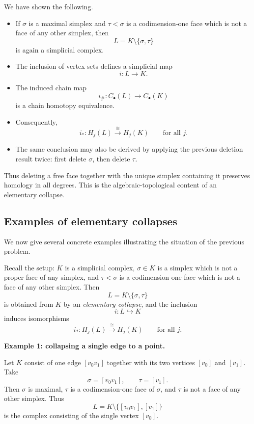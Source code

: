 \documentclass[12pt,a4paper]{article}
\theoremstyle{notespace}
\begin{document}
We have shown the following.

\begin{itemize}
	\item If \(\sigma\) is a maximal simplex and \(\tau<\sigma\) is a codimension-one face which is not a face of any other simplex, then
	\[
	L=K\setminus\{\sigma,\tau\}
	\]
	is again a simplicial complex.
	
	\item The inclusion of vertex sets defines a simplicial map
	\[
	i:L\to K.
	\]
	
	\item The induced chain map
	\[
	i_\#:C_\bullet(L)\to C_\bullet(K)
	\]
	is a chain homotopy equivalence.
	
	\item Consequently,
	\[
	i_*:H_j(L)\xrightarrow{\cong} H_j(K)
	\qquad\text{for all } j.
	\]
	
	\item The same conclusion may also be derived by applying the previous deletion result twice: first delete \(\sigma\), then delete \(\tau\).
\end{itemize}

Thus deleting a free face together with the unique simplex containing it preserves homology in all degrees. This is the algebraic-topological content of an elementary collapse.

\subsection{Examples of elementary collapses}

We now give several concrete examples illustrating the situation of the previous problem.

Recall the setup: \(K\) is a simplicial complex, \(\sigma\in K\) is a simplex which is not a proper face of any simplex, and \(\tau<\sigma\) is a codimension-one face which is not a face of any other simplex. Then
\[
L=K\setminus\{\sigma,\tau\}
\]
is obtained from \(K\) by an \emph{elementary collapse}, and the inclusion
\[
i:L\hookrightarrow K
\]
induces isomorphisms
\[
i_*:H_j(L)\xrightarrow{\cong} H_j(K)
\qquad\text{for all } j.
\]

\medskip

\textbf{Example 1: collapsing a single edge to a point.}

Let \(K\) consist of one edge \([v_0v_1]\) together with its two vertices \([v_0]\) and \([v_1]\). Take
\[
\sigma=[v_0v_1],\qquad \tau=[v_1].
\]
Then \(\sigma\) is maximal, \(\tau\) is a codimension-one face of \(\sigma\), and \(\tau\) is not a face of any other simplex. Thus
\[
L=K\setminus\{[v_0v_1],[v_1]\}
\]
is the complex consisting of the single vertex \([v_0]\).
\end{document}
